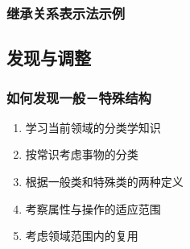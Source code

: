 \documentclass[compress]{beamer}
\begin{document}
\begin{frame}
  \frametitle{继承关系表示法示例}
  \centering{}
\end{frame}

\subsection{发现与调整}

\begin{frame}
  \frametitle{如何发现一般－特殊结构}
  \begin{enumerate}
    \item 学习当前领域的分类学知识
    \item 按常识考虑事物的分类
    \item 根据一般类和特殊类的两种定义
    \item 考察属性与操作的适应范围
    \item 考虑领域范围内的复用
  \end{enumerate}
\end{frame}
\end{document}
